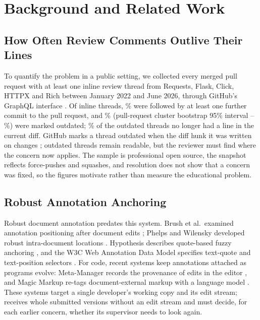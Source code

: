 \section{Background and Related Work}\label{sec:related}

\subsection{How Often Review Comments Outlive Their Lines}\label{sec:motivation}
To quantify the problem in a public setting, we collected every merged pull request with at least one inline review thread from Requests, Flask, Click, HTTPX and Rich between January 2022 and June 2026, through GitHub's GraphQL interface \cite{githubgraphql}. Of \wpeThreads{} inline threads, \wpeFollowedPct\% were followed by at least one further commit to the pull request, and \wpeOutdatedPct\% (pull-request cluster bootstrap 95\% interval \wpeOutdatedLo--\wpeOutdatedHi\%) were marked outdated; \wpeNullLinePct\% of the outdated threads no longer had a line in the current diff. GitHub marks a thread outdated when the diff hunk it was written on changes \cite{github2018outdating}; outdated threads remain readable, but the reviewer must find where the concern now applies. The sample is professional open source, the snapshot reflects force-pushes and squashes, and resolution does not show that a concern was fixed, so the figures motivate rather than measure the educational problem.

\subsection{Robust Annotation Anchoring}
Robust document annotation predates this system. Brush et al.\ examined annotation positioning after document edits \cite{brush2001robust}; Phelps and Wilensky developed robust intra-document locations \cite{phelps2000robust}. Hypothesis describes quote-based fuzzy anchoring \cite{csillag2013fuzzy}, and the W3C Web Annotation Data Model specifies text-quote and text-position selectors \cite{w3c2017annotation}. For code, recent systems keep annotations attached as programs evolve: Meta-Manager records the provenance of edits in the editor \cite{horvath2024metamanager}, and Magic Markup re-tags document-external markup with a language model \cite{misback2024magic}. These systems target a single developer's working copy and its edit stream; \sys{} receives whole submitted versions without an edit stream and must decide, for each earlier concern, whether its supervisor needs to look again.


